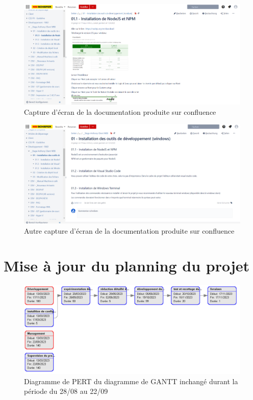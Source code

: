 \documentclass[a4paper, 12pt, french]{article}
\begin{document}
		\begin{figure}[h!]
			\includegraphics[width=\linewidth]{confluence_nodejs.png}
			\caption{Capture d'écran de la documentation produite sur confluence}
		\end{figure}
		\begin{figure}[h!]
			\includegraphics[width=\linewidth]{confluence_tools.png}
			\caption{Autre capture d'écran de la documentation produite sur confluence}
		\end{figure}
		
	\newpage

	\section{Mise à jour du planning du projet}
		\begin{figure}[h!]
			\includegraphics[width=\linewidth]{gantt_13_04_13_05.png}
			\caption{Diagramme de PERT du diagramme de GANTT inchangé durant la période du 28/08 au 22/09}
		\end{figure}
		
		
\end{document}
